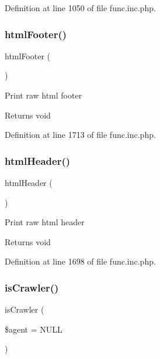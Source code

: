 Definition at line 1050 of file func.\+inc.\+php.

\hypertarget{func_8inc_8php_a2f21eda8628bd378f56529cb680006b0}{}\label{func_8inc_8php_a2f21eda8628bd378f56529cb680006b0} 
\subsubsection{\texorpdfstring{html\+Footer()}{htmlFooter()}}
{\footnotesize\ttfamily html\+Footer (\begin{DoxyParamCaption}{ }\end{DoxyParamCaption})}

Print raw html footer

\begin{DoxyReturn}{Returns}
void 
\end{DoxyReturn}


Definition at line 1713 of file func.\+inc.\+php.

\hypertarget{func_8inc_8php_adf603cdce37b515631c58bb3acffa614}{}\label{func_8inc_8php_adf603cdce37b515631c58bb3acffa614} 
\subsubsection{\texorpdfstring{html\+Header()}{htmlHeader()}}
{\footnotesize\ttfamily html\+Header (\begin{DoxyParamCaption}{ }\end{DoxyParamCaption})}

Print raw html header

\begin{DoxyReturn}{Returns}
void 
\end{DoxyReturn}


Definition at line 1698 of file func.\+inc.\+php.

\hypertarget{func_8inc_8php_a490ffbd4821da1995c76c381553d5b3d}{}\label{func_8inc_8php_a490ffbd4821da1995c76c381553d5b3d} 
\subsubsection{\texorpdfstring{is\+Crawler()}{isCrawler()}}
{\footnotesize\ttfamily is\+Crawler (\begin{DoxyParamCaption}\item[{}]{\$agent = {\ttfamily NULL} }\end{DoxyParamCaption})}

